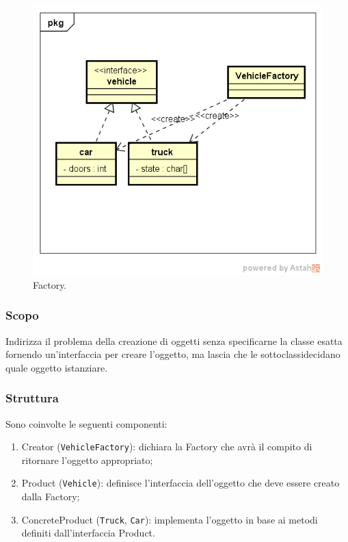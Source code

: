 \begin{figure}[H] \label{fig:factory}
	\includegraphics[scale=0.8]{img/factory2.png}
	\caption{Factory.}
\end{figure}

\subsubsection{Scopo} Indirizza il problema della creazione di oggetti senza specificarne la classe esatta fornendo un'interfaccia per creare l'oggetto, ma lascia che le sottoclassidecidano quale oggetto istanziare.

\subsubsection{Struttura} Sono coinvolte le seguenti componenti:
\begin{enumerate}
	\item Creator (\texttt{VehicleFactory}): dichiara la Factory che avrà il compito di ritornare l'oggetto appropriato;
	\item Product (\texttt{Vehicle}): definisce l'interfaccia dell'oggetto che deve essere creato dalla Factory;
	\item ConcreteProduct (\texttt{Truck}, \texttt{Car}): implementa l'oggetto in base ai metodi  definiti dall'interfaccia Product.
\end{enumerate}

